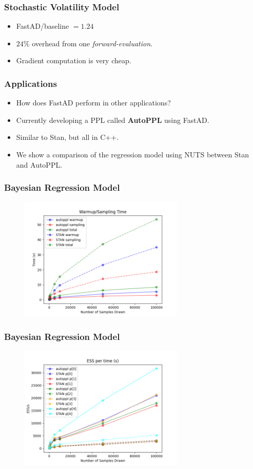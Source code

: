 \begin{frame}
\frametitle{Stochastic Volatility Model}
\begin{itemize}
    
\item FastAD/baseline $= 1.24$
\item $24\%$ overhead from one \emph{forward-evaluation}.
\item Gradient computation is very cheap.

\end{itemize}
\end{frame}
\fi

\begin{frame}
\frametitle{Applications}
\begin{itemize}
    
\item How does FastAD perform in other applications?
\item Currently developing a PPL called \textbf{AutoPPL} using FastAD.\@
\item Similar to Stan, but all in C++.
\item We show a comparison of the regression model using NUTS
    between Stan and AutoPPL.\@

\end{itemize}
\end{frame}

\begin{frame}
\frametitle{Bayesian Regression Model}
\begin{figure}
    \includegraphics[width=0.7\textwidth]{figs/runtime.png}
\end{figure}
\end{frame}

\begin{frame}
\frametitle{Bayesian Regression Model}
\begin{figure}
    \includegraphics[width=0.7\textwidth]{figs/ess_s.png}
\end{figure}
\end{frame}
